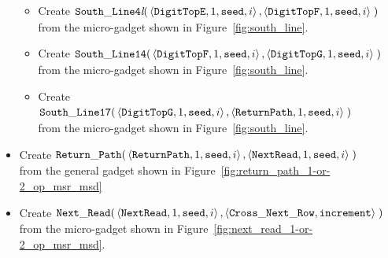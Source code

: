 \begin{itemize}
\begin{itemize}
        \item Create
        $\begin{aligned}[t]
            {\tt South\_Line4\textit{l}}(& \left\langle {\tt DigitTopE}, 1, {\tt seed}, i \right\rangle,
                                           \left\langle {\tt DigitTopF}, 1, {\tt seed}, i \right\rangle \;)
        \end{aligned}$\\ from the micro-gadget shown in Figure~\ref{fig:south_line}.

        \item Create
        $\begin{aligned}[t]
            {\tt South\_Line14}(& \left\langle {\tt DigitTopF}, 1, {\tt seed}, i\right\rangle,
                                  \left\langle {\tt DigitTopG}, 1, {\tt seed}, i\right\rangle \;)
        \end{aligned}$\\ from the micro-gadget shown in Figure~\ref{fig:south_line}.

        \item Create
        $\begin{aligned}[t]
            {\tt South\_Line17}(& \left\langle {\tt DigitTopG}, 1, {\tt seed}, i \right\rangle,
                                  \left\langle {\tt ReturnPath}, 1, {\tt seed}, i  \right\rangle \;)
        \end{aligned}$\\from the micro-gadget shown in Figure~\ref{fig:south_line}.
    \end{itemize}

    \item Create
    $\begin{aligned}[t]
            {\tt Return\_Path}(&\left\langle {\tt ReturnPath}, 1, {\tt seed}, i \right\rangle,
                         \left\langle {\tt NextRead},   1, {\tt seed}, i \right\rangle \;)
    \end{aligned}$\\from the general gadget shown in Figure~\ref{fig:return_path_1-or-2_op_msr_msd}


    \item Create
    $\begin{aligned}[t]
        {\tt Next\_Read}(& \left\langle {\tt NextRead}, 1,      {\tt seed}, i  \right\rangle,
                    \left\langle {\tt Cross\_Next\_Row}, {\tt increment}\right\rangle \;)
    \end{aligned}$\\from the micro-gadget shown in Figure~\ref{fig:next_read_1-or-2_op_msr_msd}.
\end{itemize}



